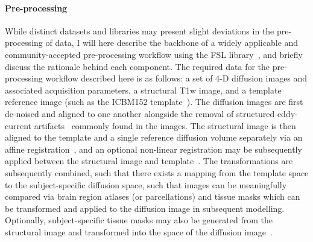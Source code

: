 \paragraph*{Pre-processing}
While distinct datasets and libraries may present slight deviations in the pre-processing of data, I will here describe
the backbone of a widely applicable and community-accepted pre-processing workflow using the FSL
library~\cite{WOOLRICH2009S173,jenkinson2012fsl,Glasser2013-vf}, and briefly discuss the rationale behind each
component. The required data for the pre-processing workflow described here is as follows: a set of 4-D diffusion
images and associated acquisition parameters, a structural T1w image, and a template reference image (such as the
ICBM152 template~\cite{lancaster2007bias}). The diffusion images are first de-noised and aligned to one another
alongside the removal of structured eddy-current artifacts~\cite{andersson2016integrated} commonly found in the images.
The structural image is then aligned to the template and a single reference diffusion volume separately via an affine
registration~\cite{jenkinson2001global}, and an optional non-linear registration may be subsequently applied between
the structural image and template~\cite{jenkinson2012fsl}. The transformations are subsequently combined, such that
there exists a mapping from the template space to the subject-specific diffusion space, such that images can be
meaningfully compared via brain region atlases (or parcellations) and tissue masks which can be transformed and applied
to the diffusion image in subsequent modelling. Optionally, subject-specific tissue masks may also be generated from
the structural image and transformed into the space of the diffusion image~\cite{zhang2001segmentation}.

